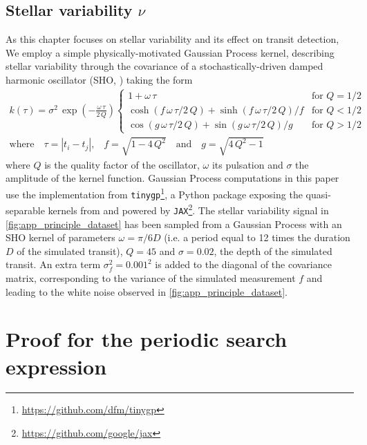 \documentclass{aastex631}
\begin{document}
\subsection{Stellar variability $\nu$}\label{app_gp}
As this chapter focuses on stellar variability and its effect on transit detection, We employ a simple physically-motivated Gaussian Process kernel, describing stellar variability through the covariance of a stochastically-driven damped harmonic oscillator (SHO, \citealt{celerite, celerite2}) taking the form 
\begin{equation}
    \begin{gathered}
        k(\tau) = \sigma^2\,\exp\left(-\frac{\omega\,\tau}{2\,Q}\right)
        \left\{\begin{array}{ll}
            1 + \omega\,\tau & \mbox{for } Q = 1/2 \\
            \cosh(f\,\omega\,\tau/2\,Q) + \sinh(f\,\omega\,\tau/2\,Q)/f
                & \mbox{for } Q < 1/2 \\
            \cos(g\,\omega\,\tau/2\,Q) + \sin(g\,\omega\,\tau/2\,Q)/g
                & \mbox{for } Q > 1/2
        \end{array}\right. \\
        \text{where}\quad \tau = |t_i - t_j|\text{,}\quad f = \sqrt{1 - 4\,Q^2} \quad \text{and}\quad g = \sqrt{4\,Q^2 - 1}
    \end{gathered}
\end{equation}
where $Q$ is the quality factor of the oscillator, $\omega$ its pulsation and $\sigma$ the amplitude of the kernel function. Gaussian Process computations in this paper use the implementation from \texttt{tinygp}\footnote{\href{https://github.com/dfm/tinygp}{https://github.com/dfm/tinygp}}, a Python package exposing the quasi-separable kernels from \cite{celerite2} and powered by \texttt{JAX}\footnote{\href{https://github.com/google/jax}{https://github.com/google/jax}}. The stellar variability signal in \autoref{fig:app_principle_dataset} has been sampled from a Gaussian Process with an SHO kernel of parameters $\omega = \pi/6D$ (i.e. a period equal to 12 times the duration $D$ of the simulated transit), $Q=45$ and $\sigma=0.02$, the depth of the simulated transit. An extra term $\sigma_f^2=0.001^2$ is added to the diagonal of the covariance matrix, corresponding to the variance of the simulated measurement $f$ and leading to the white noise observed in \autoref{fig:app_principle_dataset}.

\section{Proof for the periodic search expression}\label{proof}
\end{document}
